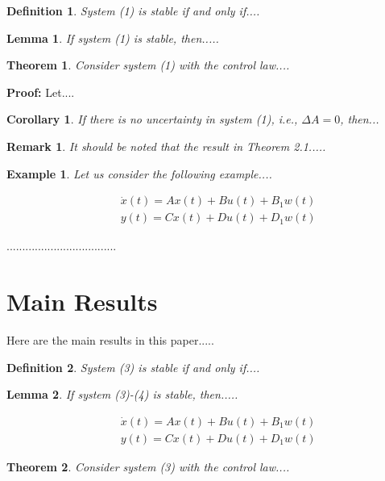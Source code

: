 \documentclass[12pt,a4paper]{icicel}
\newtheorem{corollary}{Corollary}[section]
\newtheorem{theorem}{Theorem}[section]
\newtheorem{lemma}{Lemma}[section]
\newtheorem{remark}{Remark}[section]
\newtheorem{definition}{Definition}[section]
\newtheorem{example}{Example}[section]
\begin{document}
\begin{definition}
System (1) is stable if and only if....
\end{definition}

\begin{lemma}
If system (1) is stable, then.....
\end{lemma}

\begin{theorem}
Consider system (1) with the control law....
\end{theorem}

{\bf Proof:} Let....

\begin{corollary}
If there is no uncertainty in system (1), i.e., $\Delta A=0$, then...
\end{corollary}

\begin{remark}
It should be noted that the result in Theorem 2.1.....
\end{remark}

\begin{example}
Let us consider the following example....
\end{example}

\begin{eqnarray}
&&\dot x(t)=Ax(t)+Bu(t)+B_1w(t)\\
&&y(t)=Cx(t)+Du(t)+D_1w(t)
\end{eqnarray}

...................................


\section {Main Results}

Here are the main results in this paper.....

 \begin{definition}
System (3) is stable if and only if....
\end{definition}

\begin{lemma}
If system (3)-(4) is stable, then.....
\end{lemma}

\begin{eqnarray}
&&\dot x(t)=Ax(t)+Bu(t)+B_1w(t)\\
&&y(t)=Cx(t)+Du(t)+D_1w(t)
\end{eqnarray}

\begin{theorem}
Consider system (3) with the control law....
\end{theorem}
\end{document}
